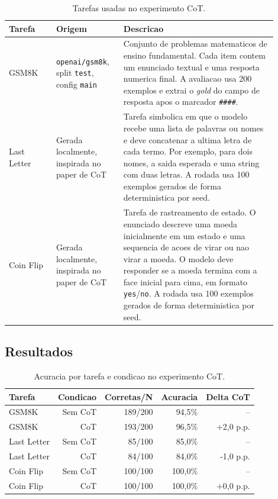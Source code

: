 \documentclass[a4paper,12pt]{article}
\begin{document}
\begin{table}[h]
\centering
\caption{Tarefas usadas no experimento CoT.}
\label{tab:cot_tasks}
\begin{tabular}{p{0.16\linewidth}p{0.22\linewidth}p{0.52\linewidth}}
\toprule
Tarefa & Origem & Descricao \\
\midrule
GSM8K & \texttt{openai/gsm8k}, split \texttt{test}, config \texttt{main} &
Conjunto de problemas matematicos de ensino fundamental. Cada item contem um
enunciado textual e uma resposta numerica final. A avaliacao usa 200 exemplos
e extrai o \textit{gold} do campo de resposta apos o marcador \texttt{\#\#\#\#}. \\
Last Letter & Gerada localmente, inspirada no paper de CoT &
Tarefa simbolica em que o modelo recebe uma lista de palavras ou nomes e deve
concatenar a ultima letra de cada termo. Por exemplo, para dois nomes, a saida
esperada e uma string com duas letras. A rodada usa 100 exemplos gerados de
forma deterministica por seed. \\
Coin Flip & Gerada localmente, inspirada no paper de CoT &
Tarefa de rastreamento de estado. O enunciado descreve uma moeda inicialmente
em um estado e uma sequencia de acoes de virar ou nao virar a moeda. O modelo
deve responder se a moeda termina com a face inicial para cima, em formato
\texttt{yes}/\texttt{no}. A rodada usa 100 exemplos gerados de forma
deterministica por seed. \\
\bottomrule
\end{tabular}
\end{table} 
\newpage
\subsection{Resultados}

\begin{table}[h]
\centering
\caption{Acuracia por tarefa e condicao no experimento CoT.}
\label{tab:cot_accuracy}
\begin{tabular}{lrrrr}
\toprule
Tarefa & Condicao & Corretas/N & Acuracia & Delta CoT \\
\midrule
GSM8K & Sem CoT & 189/200 & 94,5\% & -- \\
GSM8K & CoT & 193/200 & 96,5\% & +2,0 p.p. \\
Last Letter & Sem CoT & 85/100 & 85,0\% & -- \\
Last Letter & CoT & 84/100 & 84,0\% & -1,0 p.p. \\
Coin Flip & Sem CoT & 100/100 & 100,0\% & -- \\
Coin Flip & CoT & 100/100 & 100,0\% & +0,0 p.p. \\
\bottomrule
\end{tabular}
\end{table}
\end{document}
